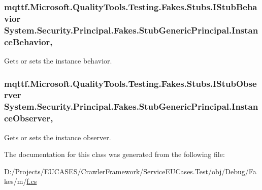 \hypertarget{class_system_1_1_security_1_1_principal_1_1_fakes_1_1_stub_generic_principal_a396a79b378138c6ef8af3dbf3942015a}{
\subsubsection[{Instance\-Behavior}]{\setlength{\rightskip}{0pt plus 5cm}mqttf.\-Microsoft.\-Quality\-Tools.\-Testing.\-Fakes.\-Stubs.\-I\-Stub\-Behavior System.\-Security.\-Principal.\-Fakes.\-Stub\-Generic\-Principal.\-Instance\-Behavior\hspace{0.3cm}{\ttfamily [get]}, {\ttfamily [set]}}}\label{class_system_1_1_security_1_1_principal_1_1_fakes_1_1_stub_generic_principal_a396a79b378138c6ef8af3dbf3942015a}


Gets or sets the instance behavior.

\hypertarget{class_system_1_1_security_1_1_principal_1_1_fakes_1_1_stub_generic_principal_af8093da182582fa96f8f7303c45aa797}{
\subsubsection[{Instance\-Observer}]{\setlength{\rightskip}{0pt plus 5cm}mqttf.\-Microsoft.\-Quality\-Tools.\-Testing.\-Fakes.\-Stubs.\-I\-Stub\-Observer System.\-Security.\-Principal.\-Fakes.\-Stub\-Generic\-Principal.\-Instance\-Observer\hspace{0.3cm}{\ttfamily [get]}, {\ttfamily [set]}}}\label{class_system_1_1_security_1_1_principal_1_1_fakes_1_1_stub_generic_principal_af8093da182582fa96f8f7303c45aa797}


Gets or sets the instance observer.



The documentation for this class was generated from the following file\-:\begin{DoxyCompactItemize}
\item 
D\-:/\-Projects/\-E\-U\-C\-A\-S\-E\-S/\-Crawler\-Framework/\-Service\-E\-U\-Cases.\-Test/obj/\-Debug/\-Fakes/m/\hyperlink{m_2f_8cs}{f.\-cs}\end{DoxyCompactItemize}
